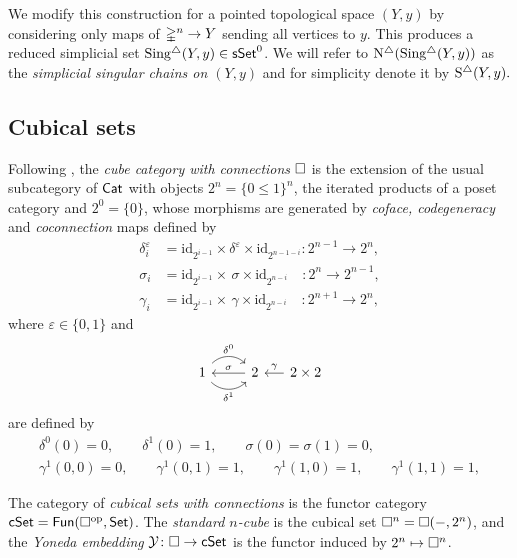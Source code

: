 We modify this construction for a pointed topological space $(Y, y)$ by considering only maps of $\mathbb{\Delta}^n \to Y$ sending all vertices to $y$.
This produces a reduced simplicial set $\operatorname{Sing^{\triangle}}(Y, y) \in \mathsf{sSet}^0$. We will refer to $\operatorname{N^{\triangle}}(\operatorname{Sing^{\triangle}}(Y, y))$ as the \textit{simplicial singular chains on $(Y,y)$} and for simplicity denote it by $\operatorname{S^{\triangle}}(Y,y).$

\subsection{Cubical sets} \label{ss:cubical sets}

Following \cite{brown1981cubes}, the \textit{cube category with connections} $\square$ is the extension of the usual subcategory of $\mathsf{Cat}$ with objects $2^n = \{0 \leq 1\}^n$, the iterated products of a poset category and $2^0 = \{0\}$, whose morphisms are generated by \textit{coface, codegeneracy} and \textit{coconnection} maps defined by
\begin{align*}
\delta_i^\varepsilon & =
\mathrm{id}_{2^{i-1}} \times \delta^\varepsilon \times \mathrm{id}_{2^{n-1-i}} \colon 2^{n-1} \to 2^n, \\
\sigma_i & =
\mathrm{id}_{2^{i-1}} \times \, \sigma \times \mathrm{id}_{2^{n-i}} \quad \colon 2^{n} \to 2^{n-1}, \\
\gamma_i & =
\mathrm{id}_{2^{i-1}} \times \, \gamma \times \mathrm{id}_{2^{n-i}} \quad \colon 2^{n+1} \to 2^{n},
\end{align*}
where $\varepsilon \in \{0,1\}$ and
\begin{equation*}
\begin{tikzcd}
1 \arrow[r, out=45, in=135, "\delta^0"] \arrow[r, out=-45, in=-135, "\delta^1"'] & 2 \arrow[l, "\sigma"'] &[-10pt] \arrow[l, "\gamma"'] 2 \times 2
\end{tikzcd}
\end{equation*}
are defined by
\begin{gather*}
\delta^0(0) = 0, \qquad
\delta^1(0) = 1, \qquad
\sigma(0) = \sigma(1) = 0, \qquad \\
\gamma^1(0,0) = 0, \qquad
\gamma^1(0,1) = 1, \qquad
\gamma^1(1,0) = 1, \qquad
\gamma^1(1,1) = 1, 
\end{gather*}

The category of \textit{cubical sets with connections} is the functor category $\mathsf{cSet} = \mathsf{Fun}(\square^{\mathrm{op}}, \mathsf{Set})$.
The \textit{standard $n$-cube} is the cubical set $\square^n = \square(-, 2^n)$, and the \textit{Yoneda embedding} $\operatorname{\mathcal{Y}} \colon \square \to \mathsf{cSet}$ is the functor induced by $2^n \mapsto \square^n$.

